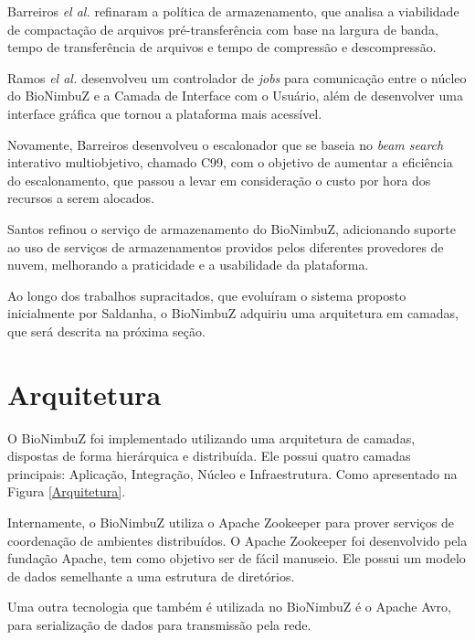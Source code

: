 Barreiros \textit{el al.}\cite{BioNimbuZ_BioCirrus} refinaram a política de armazenamento, que analisa a viabilidade de compactação de arquivos pré-transferência com base na largura de banda, tempo de transferência de arquivos e tempo de compressão e descompressão.

Ramos \textit{el al.}\cite{BioNimbuZ_Ramos} desenvolveu um controlador de \textit{jobs} para comunicação entre o núcleo do BioNimbuZ e a Camada de Interface com o Usuário, além de desenvolver uma interface gráfica que tornou a plataforma mais acessível.

Novamente, Barreiros\cite{BioNimbuZ_Willian_C99} desenvolveu o escalonador que se baseia no \textit{beam search} interativo multiobjetivo, chamado C99, com o objetivo de aumentar a eficiência do escalonamento, que passou a levar em consideração o custo por hora dos recursos a serem alocados.

Santos\cite{BioNimbuZ_Santos} refinou o serviço de armazenamento do BioNimbuZ, adicionando suporte ao uso de serviços de armazenamentos providos pelos diferentes provedores de nuvem, melhorando a praticidade e a usabilidade da plataforma.

Ao longo dos trabalhos supracitados, que evoluíram o sistema proposto inicialmente por Saldanha\cite{Saldanha_BioNimbus}, o BioNimbuZ adquiriu uma arquitetura em camadas, que será descrita na próxima seção.

\section{Arquitetura}
O BioNimbuZ foi implementado utilizando uma arquitetura de camadas, dispostas de forma hierárquica e distribuída. Ele possui quatro camadas principais: Aplicação, Integração, Núcleo e Infraestrutura. Como apresentado na Figura \ref{Arquitetura}.

Internamente, o BioNimbuZ utiliza o Apache Zookeeper\cite{Zookeeper} para prover serviços de coordenação de ambientes distribuídos. O Apache Zookeeper foi desenvolvido pela fundação Apache\cite{Apache}, tem como objetivo ser de fácil manuseio. Ele possui um modelo de dados semelhante a uma estrutura de diretórios.

Uma outra tecnologia que também é utilizada no BioNimbuZ é o Apache Avro\cite{Avro}, para serialização de dados para transmissão pela rede.


